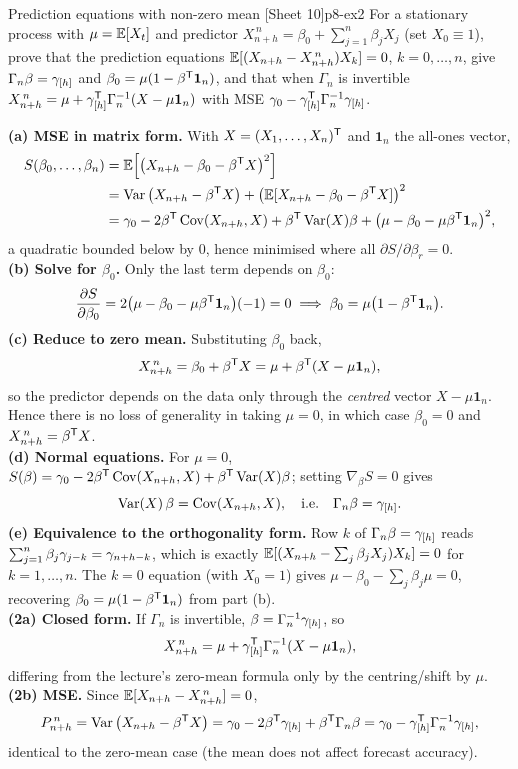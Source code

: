 \begin{exercise}{Prediction equations with non-zero mean \quad\textnormal{[Sheet 10]}}{p8-ex2}
For a stationary process with $\mu=\mathbb{E}[X_t]$ and predictor
$X^{\,n}_{n+h}=\beta_0+\sum_{j=1}^n\beta_jX_j$ (set $X_0\equiv1$), prove that the
prediction equations $\mathbb{E}[(X_{n+h}-X^{\,n}_{n+h})X_k]=0$, $k=0,\dots,n$, give
$\Gamma_n\beta=\gamma_{[h]}$ and $\beta_0=\mu(1-\beta^{\mathsf{T}}\mathbf1_n)$, and that
when $\Gamma_n$ is invertible
$X^{\,n}_{n+h}=\mu+\gamma_{[h]}^{\mathsf{T}}\Gamma_n^{-1}(X-\mu\mathbf1_n)$ with MSE
$\gamma_0-\gamma_{[h]}^{\mathsf{T}}\Gamma_n^{-1}\gamma_{[h]}$.
\end{exercise}
\begin{solution}
\textbf{(a) MSE in matrix form.} With $X=(X_1,\dots,X_n)^{\mathsf{T}}$ and
$\mathbf1_n$ the all-ones vector,
\[
\begin{aligned}
S(\beta_0,\dots,\beta_n)
&=\mathbb{E}\Big[\big(X_{n+h}-\beta_0-\beta^{\mathsf{T}} X\big)^2\Big]\\
&=\operatorname{Var}\big(X_{n+h}-\beta^{\mathsf{T}} X\big)+\big(\mathbb{E}[X_{n+h}-\beta_0-\beta^{\mathsf{T}} X]\big)^2\\
&=\gamma_0-2\beta^{\mathsf{T}}\operatorname{Cov}(X_{n+h},X)+\beta^{\mathsf{T}}\operatorname{Var}(X)\beta+\big(\mu-\beta_0-\mu\beta^{\mathsf{T}}\mathbf1_n\big)^2,
\end{aligned}
\]
a quadratic bounded below by $0$, hence minimised where all
$\partial S/\partial\beta_r=0$.\\
\textbf{(b) Solve for $\beta_0$.} Only the last term depends on $\beta_0$:
\[
\frac{\partial S}{\partial\beta_0}=2\big(\mu-\beta_0-\mu\beta^{\mathsf{T}}\mathbf1_n\big)(-1)
=0
\;\Longrightarrow\;
\beta_0=\mu\big(1-\beta^{\mathsf{T}}\mathbf1_n\big).
\]
\textbf{(c) Reduce to zero mean.} Substituting $\beta_0$ back,
\[
X^{\,n}_{n+h}=\beta_0+\beta^{\mathsf{T}} X=\mu+\beta^{\mathsf{T}}(X-\mu\mathbf1_n),
\]
so the predictor depends on the data only through the \emph{centred} vector
$X-\mu\mathbf1_n$. Hence there is no loss of generality in taking $\mu=0$, in
which case $\beta_0=0$ and $X^{\,n}_{n+h}=\beta^{\mathsf{T}} X$.\\
\textbf{(d) Normal equations.} For $\mu=0$,
$S(\beta)=\gamma_0-2\beta^{\mathsf{T}}\operatorname{Cov}(X_{n+h},X)+\beta^{\mathsf{T}}\operatorname{Var}(X)\beta$; setting
$\nabla_\beta S=0$ gives
\[
\operatorname{Var}(X)\,\beta=\operatorname{Cov}(X_{n+h},X),\quad\text{i.e.}\quad \Gamma_n\beta=\gamma_{[h]}.
\]
\textbf{(e) Equivalence to the orthogonality form.} Row $k$ of
$\Gamma_n\beta=\gamma_{[h]}$ reads $\sum_{j=1}^n\beta_j\gamma_{j-k}=\gamma_{n+h-k}$,
which is exactly $\mathbb{E}[(X_{n+h}-\sum_j\beta_jX_j)X_k]=0$ for $k=1,\dots,n$. The
$k=0$ equation (with $X_0=1$) gives $\mu-\beta_0-\sum_j\beta_j\mu=0$, recovering
$\beta_0=\mu(1-\beta^{\mathsf{T}}\mathbf1_n)$ from part (b).\\
\textbf{(2a) Closed form.} If $\Gamma_n$ is invertible,
$\beta=\Gamma_n^{-1}\gamma_{[h]}$, so
\[
X^{\,n}_{n+h}=\mu+\gamma_{[h]}^{\mathsf{T}}\Gamma_n^{-1}(X-\mu\mathbf1_n),
\]
differing from the lecture's zero-mean formula only by the centring/shift by
$\mu$.\\
\textbf{(2b) MSE.} Since $\mathbb{E}[X_{n+h}-X^{\,n}_{n+h}]=0$,
\[
P^{\,n}_{n+h}=\operatorname{Var}\big(X_{n+h}-\beta^{\mathsf{T}} X\big)
=\gamma_0-2\beta^{\mathsf{T}}\gamma_{[h]}+\beta^{\mathsf{T}}\Gamma_n\beta
=\gamma_0-\gamma_{[h]}^{\mathsf{T}}\Gamma_n^{-1}\gamma_{[h]},
\]
identical to the zero-mean case (the mean does not affect forecast accuracy).
\end{solution}

